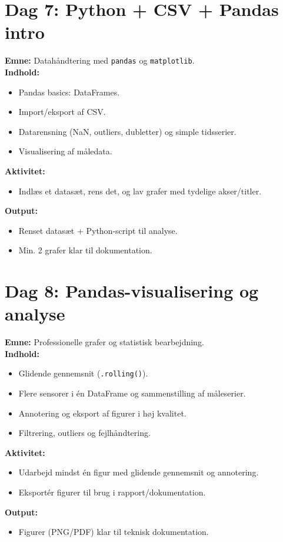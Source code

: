 \documentclass[a4paper,11pt]{article}
\begin{document}
\section{Dag 7: Python + CSV + Pandas intro}

\textbf{Emne:} Datahåndtering med \texttt{pandas} og \texttt{matplotlib}.\\
\textbf{Indhold:}
\begin{itemize}
  \item Pandas basics: DataFrames.
  \item Import/eksport af CSV.
  \item Datarensning (NaN, outliers, dubletter) og simple tidsserier.
  \item Visualisering af måledata.
\end{itemize}
\textbf{Aktivitet:}
\begin{itemize}
  \item Indlæs et datasæt, rens det, og lav grafer med tydelige akser/titler.
\end{itemize}
\textbf{Output:}
\begin{itemize}
  \item Renset datasæt + Python-script til analyse.
  \item Min. 2 grafer klar til dokumentation.
\end{itemize}


\section{Dag 8: Pandas-visualisering og analyse}

\textbf{Emne:} Professionelle grafer og statistisk bearbejdning.\\
\textbf{Indhold:}
\begin{itemize}
  \item Glidende gennemsnit (\texttt{.rolling()}).
  \item Flere sensorer i én DataFrame og sammenstilling af måleserier.
  \item Annotering og eksport af figurer i høj kvalitet.
  \item Filtrering, outliers og fejlhåndtering.
\end{itemize}
\textbf{Aktivitet:}
\begin{itemize}
  \item Udarbejd mindst én figur med glidende gennemsnit og annotering.
  \item Eksportér figurer til brug i rapport/dokumentation.
\end{itemize}
\textbf{Output:}
\begin{itemize}
  \item Figurer (PNG/PDF) klar til teknisk dokumentation.
\end{itemize}
\end{document}
